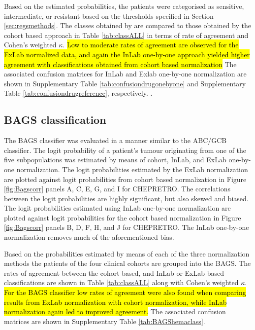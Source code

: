 \documentclass{article}
\begin{document}
Based on the estimated probabilities, the patients were categorised as sensitive, intermediate, or resistant based on the thresholds specified in Section \ref{sec:regsmethods}.
The classes obtained by \hemaClass{} are compared to those obtained by the cohort based approach in Table \ref{tab:classALL} in terms of rate of agreement and Cohen's weighted $\kappa$. \hl{Low to moderate rates of agreement are observed for the ExLab normalized data, and again the InLab one-by-one approach yielded higher agreement with classifications obtained from cohort based normalization}
The associated confusion matrices for InLab and Exlab one-by-one normalization are shown in
Supplementary Table \ref{tab:confusiondrugonebyone} and
Supplementary Table \ref{tab:confusiondrugreference}, respectively.
.


\subsection{BAGS classification}
The BAGS classifier was evaluated in a manner similar to the ABC/GCB classifier.
The logit probability of a patient's tumour originating from one of the five subpopulations was estimated by means of cohort, InLab, and ExLab one-by-one normalization.
The logit probabilities estimated by the ExLab normalization are plotted against logit probabilities from cohort based normalization in Figure \ref{fig:Bagscorr} panels A, C, E, G, and I for CHEPRETRO.
The correlations between the logit probabilities are highly significant, but also skewed and biased.
The logit probabilities estimated using InLab one-by-one normalization are plotted against logit probabilities for the cohort based normalization in Figure \ref{fig:Bagscorr} panels B, D, F, H, and J for CHEPRETRO.
The InLab one-by-one normalization removes much of the aforementioned bias.

Based on the probabilities estimated by means of each of the three normalization methods the patients of the four clinical cohorts are grouped into the BAGS.
The rates of agreement between the cohort based, and InLab or ExLab based classifications are shown in Table \ref{tab:classALL} along with Cohen's weighted $\kappa$. \hl{For the BAGS classifier low rates of agreement were also found when comparing results from ExLab normalization with cohort normalization, while InLab normalization again led to improved agreement.}
The associated confusion matrices are shown in Supplementary Table \ref{tab:BAGShemaclass}.


\end{document}

